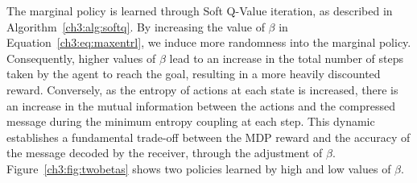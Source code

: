 The marginal policy is learned through Soft Q-Value iteration, as described in Algorithm~\ref{ch3:alg:softq}. By increasing the value of \(\beta\) in Equation~\eqref{ch3:eq:maxentrl}, we induce more randomness into the marginal policy. Consequently, higher values of \(\beta\) lead to an increase in the total number of steps taken by the agent to reach the goal, resulting in a more heavily discounted reward. Conversely, as the entropy of actions at each state is increased, there is an increase in the mutual information between the actions and the compressed message during the minimum entropy coupling at each step. This dynamic establishes a fundamental trade-off between the MDP reward and the accuracy of the message decoded by the receiver, through the adjustment of \(\beta\). Figure~\ref{ch3:fig:twobetas} shows two policies learned by high and low values of $\beta$.

